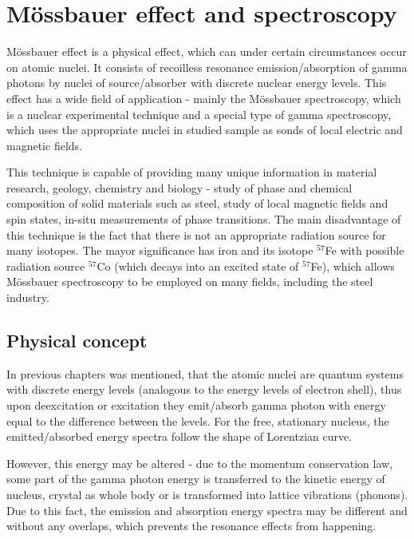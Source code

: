 
\chapter{Mössbauer effect and spectroscopy}
Mössbauer effect is a physical effect, which can under certain circumstances occur on atomic nuclei. It consists of recoilless resonance emission/absorption of gamma photons by nuclei of source/absorber with discrete nuclear energy levels. This effect has a wide field of application - mainly the Mössbauer spectroscopy, which is a nuclear experimental technique and a special type of gamma spectroscopy, which uses the appropriate nuclei in studied sample as sonds of local electric and magnetic fields. 

\par
This technique is capable of providing many unique information in material research, geology, chemistry and biology - study of phase and chemical composition of solid materials such as steel, study of local magnetic fields and spin states, in-situ measurements of phase transitions. The main disadvantage of this technique is the fact that there is not an appropriate radiation source for many isotopes. The mayor significance has iron and its isotope $^{57}$Fe with possible radiation source $^{57}$Co (which decays into an excited state of $^{57}$Fe), which allows Mössbauer spectroscopy to be employed on many fields, including the steel industry.

\section{Physical concept}
In previous chapters was mentioned, that the atomic nuclei are quantum systems with discrete energy levels (analogous to the energy levels of electron shell), thus upon deexcitation or excitation they emit/absorb gamma photon with energy equal to the difference between the levels. For the free, stationary nucleus, the emitted/absorbed energy spectra follow the shape of Lorentzian curve. 

\par
However, this energy may be altered - due to the  momentum conservation law, some part of the gamma photon energy is transferred to the  kinetic energy of nucleus, crystal as whole body or is transformed into lattice vibrations (phonons). Due to this fact, the emission and absorption energy spectra may be different and without any overlaps, which prevents the resonance effects from happening.


